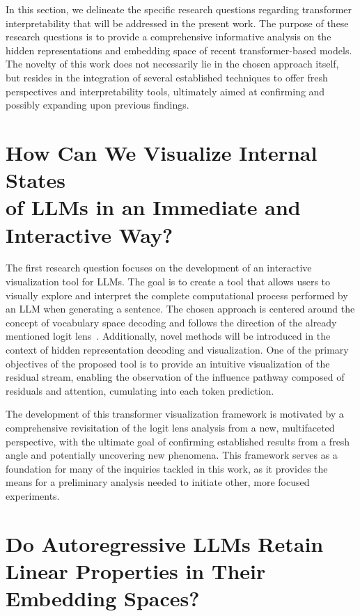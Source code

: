 In this section, we delineate the specific research questions regarding transformer interpretability that will be addressed in the present work.
The purpose of these research questions is to provide a comprehensive informative analysis on the hidden representations and embedding space of recent transformer-based models.
The novelty of this work does not necessarily lie in the chosen approach itself, but resides in the integration of several established techniques to offer fresh perspectives and interpretability tools, ultimately aimed at confirming and possibly expanding upon previous findings.

\section{How Can We Visualize Internal States \texorpdfstring{ \\ }{} of LLMs in an Immediate and \texorpdfstring{ \\ }{} Interactive Way?}\label{sec:rq_intravisto}

The first research question focuses on the development of an interactive visualization tool for LLMs.
The goal is to create a tool that allows users to visually explore and interpret the complete computational process performed by an LLM when generating a sentence.
The chosen approach is centered around the concept of vocabulary space decoding and follows the direction of the already mentioned logit lens~\cite{nostalgebraist2020}.
Additionally, novel methods will be introduced in the context of hidden representation decoding and visualization.
One of the primary objectives of the proposed tool is to provide an intuitive visualization of the residual stream, enabling the observation of the influence pathway composed of residuals and attention, cumulating into each token prediction.

The development of this transformer visualization framework is motivated by a comprehensive revisitation of the logit lens analysis from a new, multifaceted perspective, with the ultimate goal of confirming established results from a fresh angle and potentially uncovering new phenomena.
This framework serves as a foundation for many of the inquiries tackled in this work, as it provides the means for a preliminary analysis needed to initiate other, more focused experiments.

\section{Do Autoregressive LLMs Retain Linear Properties in Their Embedding Spaces?}\label{sec:rq_embeddings}

